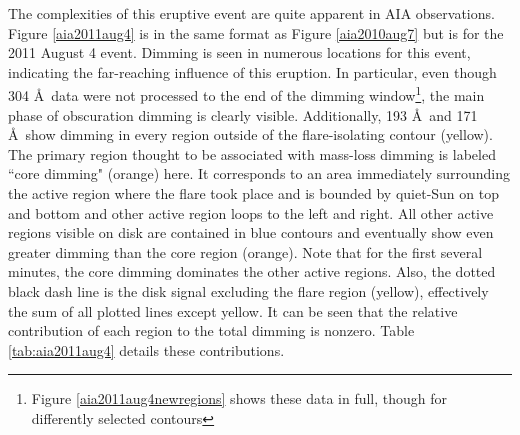 The complexities of this eruptive event are quite apparent in AIA observations. Figure \ref{aia2011aug4} is in the same format as Figure \ref{aia2010aug7} but is for the 2011 August 4 event. Dimming is seen in numerous locations for this event, indicating the far-reaching influence of this eruption. In particular, even though 304 \AA\ data were not processed to the end of the dimming window\footnote{Figure \ref{aia2011aug4newregions} shows these data in full, though for differently selected contours}, the main phase of obscuration dimming is clearly visible. Additionally, 193 \AA\ and 171 \AA\ show dimming in every region outside of the flare-isolating contour (yellow). The primary region thought to be associated with mass-loss dimming is labeled ``core dimming" (orange) here. It corresponds to an area immediately surrounding the active region where the flare took place and is bounded by quiet-Sun on top and bottom and other active region loops to the left and right. All other active regions visible on disk are contained in blue contours and eventually show even greater dimming than the core region (orange). Note that for the first several minutes, the core dimming dominates the other active regions. Also, the dotted black dash line is the disk signal excluding the flare region (yellow), effectively the sum of all plotted lines except yellow. It can be seen that the relative contribution of each region to the total dimming is nonzero. Table \ref{tab:aia2011aug4} details these contributions. 

